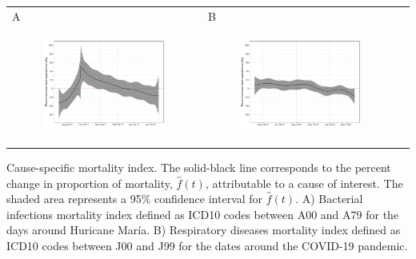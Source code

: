 \documentclass[11pt]{article}
\begin{document}
\begin{suppfigure}[ht]
	\begin{tabular}{lll}
	A&B\\
	\begin{subfigure}[t]{0.49\linewidth}
		\centering
		\includegraphics[width=1\linewidth]{figs/figure-4a.pdf} 
	\end{subfigure}&
	\begin{subfigure}[t]{0.49\linewidth}
		\centering
		\includegraphics[width=1\linewidth]{figs/figure-4b.pdf}
	\end{subfigure}&\\
    \end{tabular}
	\caption{Cause-specific mortality index. The solid-black line corresponds to the percent change in proportion of mortality, $\hat{f}(t)$, attributable to a cause of interest. The shaded area represents a 95\% confidence interval for $\hat{f}(t)$. A) Bacterial infections mortality index defined as ICD10 codes between A00 and A79 for the days around Huricane Mar\'ia. B) Respiratory diseases mortality index defined as ICD10 codes between J00 and J99 for the dates around the COVID-19 pandemic.}
	\label{fig:fhat-bacteria}
\end{suppfigure}
\end{document}

